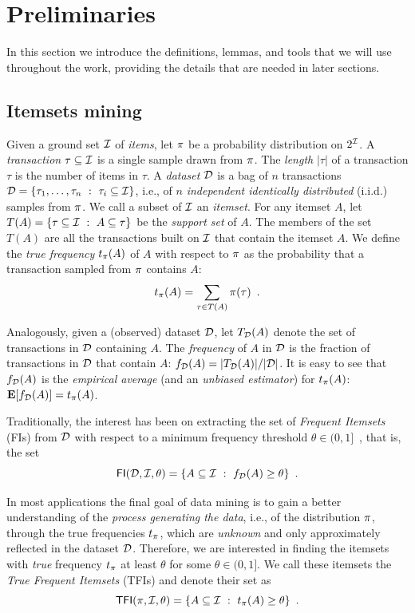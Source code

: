 \section{Preliminaries}\label{sec:prelims}
In this section we introduce the
definitions, lemmas, and tools that we will use throughout the work, providing the details that are
needed in later sections.

\subsection{Itemsets mining}\label{sec:itemdef}
Given a ground set ${\cal I}$ of \emph{items}, let $\pi$ be a
probability distribution on $2^{{\cal I}}$. A \emph{transaction} $\tau\subseteq{\cal I}$
is a single sample drawn from $\pi$. The \emph{length} $|\tau|$ of
a transaction $\tau$ is the number of items in $\tau$.
A \emph{dataset}
${\cal D}$ is a bag of $n$ transactions ${\cal D}=\{\tau_1,\dots,\tau_n ~:~
\tau_i\subseteq{\cal I}\}$, i.e., of $n$
\emph{independent identically distributed} (i.i.d.) samples from $\pi$. We
call a subset of ${\cal I}$ an \emph{itemset}. For any itemset $A$, let
$T(A)=\{\tau\subseteq{\cal I} ~:~ A\subseteq \tau\}$ be the \emph{support set}
of $A$. The members of the set $T(A)$ are all the transactions built on ${\cal I}$
that contain the itemset $A$. %
We define the
\emph{true frequency} $t_\pi(A)$ of $A$ with respect to $\pi$ as the
probability that a transaction sampled from $\pi$ contains $A$:
\[
t_\pi(A) = \sum_{\tau\in T(A)}\pi(\tau)\enspace.
\]

Analogously, given a (observed) dataset ${\cal D}$, let $T_{\cal D}(A)$ denote
the set of transactions in ${\cal D}$ containing $A$. The \emph{frequency} of $A$
in ${\cal D}$ is the fraction of transactions in ${\cal D}$ that contain $A$: $f_{\cal D}(A)=
|T_{\cal D}(A)|/|{\cal D}|$. It is easy to see that $f_{\cal D}(A)$ is the
\emph{empirical average} (and an \emph{unbiased estimator}) for $t_\pi(A)$:
${\mathbf E}[f_{\cal D}(A)]=t_\pi(A)$.

Traditionally, the interest has been on extracting the set
of \emph{Frequent Itemsets} (FIs) from ${\cal D}$ with respect to a minimum frequency
threshold $\theta\in(0,1]$~\citep{AgrawalIS93}, that is, the set 
\[
\mathsf{FI}({\cal D},{\cal I},\theta)=\{A\subseteq{\cal I} ~:~ f_{\cal D}(A)\ge\theta\}\enspace.\]

In most applications the final goal of data mining is to gain a better
understanding of the \emph{process generating the data}, i.e., of the
distribution $\pi$, through the true frequencies $t_\pi$, which are
\emph{unknown} and only approximately reflected in the dataset ${\cal D}$. Therefore, %
we are interested in finding the itemsets with \emph{true} frequency
$t_\pi$ at least $\theta$ for some $\theta\in(0,1]$. We call these itemsets the
\emph{True Frequent Itemsets} (TFIs) and denote their set as %
\[
\mathsf{TFI}(\pi,{\cal I},\theta)=\{A\subseteq{\cal I} ~:~ t_\pi(A)\ge\theta\}\enspace.\]

